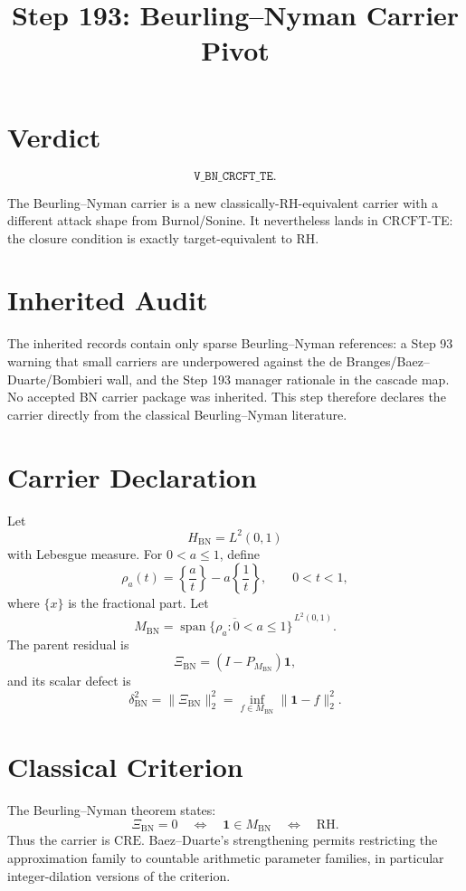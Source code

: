 \documentclass[11pt]{article}
\title{Step 193: Beurling--Nyman Carrier Pivot}
\date{}
\newcommand{\HBN}{H_{\mathrm{BN}}}
\newcommand{\MBN}{M_{\mathrm{BN}}}
\newcommand{\XiBN}{\Xi_{\mathrm{BN}}}
\newcommand{\one}{\mathbf 1}
\newcommand{\CRE}{\mathrm{CRE}}
\newcommand{\CRCFT}{\mathrm{CRCFT}}
\begin{document}
\maketitle

\section*{Verdict}

\[
\boxed{\texttt{V\_BN\_CRCFT\_TE}}.
\]

The Beurling--Nyman carrier is a new classically-RH-equivalent carrier with a different attack shape from Burnol/Sonine.  It nevertheless lands in \(\CRCFT\)-TE: the closure condition is exactly target-equivalent to RH.

\section*{Inherited Audit}

The inherited records contain only sparse Beurling--Nyman references: a Step 93 warning that small carriers are underpowered against the de Branges/Baez--Duarte/Bombieri wall, and the Step 193 manager rationale in the cascade map.  No accepted BN carrier package was inherited.  This step therefore declares the carrier directly from the classical Beurling--Nyman literature.

\section*{Carrier Declaration}

Let
\[
\HBN=L^2(0,1)
\]
with Lebesgue measure.  For \(0<a\le 1\), define
\[
\rho_a(t)=\left\{\frac{a}{t}\right\}-a\left\{\frac{1}{t}\right\},
\qquad 0<t<1,
\]
where \(\{x\}\) is the fractional part.  Let
\[
\MBN=\overline{\operatorname{span}\{\rho_a:0<a\le1\}}^{\,L^2(0,1)}.
\]
The parent residual is
\[
\XiBN=(I-P_{\MBN})\one,
\]
and its scalar defect is
\[
\delta_{\mathrm{BN}}^2
=
\|\XiBN\|_2^2
=
\inf_{f\in\MBN}\|\one-f\|_2^2.
\]

\section*{Classical Criterion}

The Beurling--Nyman theorem states:
\[
\XiBN=0
\quad\Longleftrightarrow\quad
\one\in\MBN
\quad\Longleftrightarrow\quad
\mathrm{RH}.
\]
Thus the carrier is \(\CRE\).  Baez--Duarte's strengthening permits restricting the approximation family to countable arithmetic parameter families, in particular integer-dilation versions of the criterion.
\end{document}
